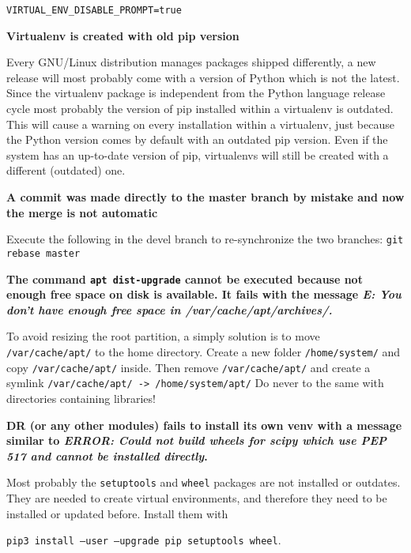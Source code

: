 \documentclass[a4paper,12pt]{article}
\begin{document}
{\tt VIRTUAL\_ENV\_DISABLE\_PROMPT=true}

\textbf{Virtualenv is created with old pip version}

Every GNU/Linux distribution manages packages shipped differently, a new release will most probably come with a version of Python which is not the latest. Since the virtualenv package is independent from the Python language release cycle most probably the version of pip installed within a virtualenv is outdated. This will cause a warning on every installation within a virtualenv, just because the Python version comes by default with an outdated pip version. Even if the system has an up-to-date version of pip, virtualenvs will still be created with a different (outdated) one.

\textbf{A commit was made directly to the master branch by mistake and now the merge is not automatic}

Execute the following in the devel branch to re-synchronize the two branches: {\tt git rebase master}

\textbf{The command {\tt apt dist-upgrade} cannot be executed because not enough free space on disk is available. It fails with the message \emph{E: You don't have enough free space in /var/cache/apt/archives/.}}

To avoid resizing the root partition, a simply solution is to move {\tt /var/cache/apt/} to the home directory.
Create a new folder {\tt /home/system/} and copy {\tt /var/cache/apt/} inside. Then remove {\tt /var/cache/apt/} and create a symlink {\tt /var/cache/apt/ -> /home/system/apt/}
Do never to the same with directories containing libraries!

\textbf{DR (or any other modules) fails to install its own venv with a message similar to \emph{ERROR: Could not build wheels for scipy which use PEP 517 and cannot be installed directly}.}

Most probably the {\tt setuptools} and {\tt wheel} packages are not installed or outdates. They are needed to create virtual environments, and therefore they need to be installed or updated before. Install them with

{\tt pip3 install --user --upgrade pip setuptools wheel}.





\end{document}
